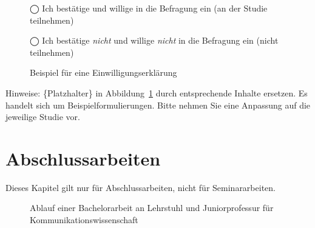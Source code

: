 \documentclass[
  letterpaper,
  DIV=11]{scrreprt}
\begin{document}
\begin{figure}
\hspace{0pt}\hspace{0pt}◯ Ich bestätige und willige in die Befragung ein
(an der Studie teilnehmen)

\hspace{0pt}\hspace{0pt}◯\hspace{0pt} Ich bestätige \emph{nicht} und
willige \emph{nicht} in die Befragung ein (nicht teilnehmen)

\caption{\label{fig-consent}Beispiel für eine Einwilligungserklärung}

\end{figure}%

Hinweise: \{Platzhalter\} in Abbildung~\ref{fig-consent} durch
entsprechende Inhalte ersetzen. Es handelt sich um
Beispielformulierungen. Bitte nehmen Sie eine Anpassung auf die
jeweilige Studie vor.

\chapter{Abschlussarbeiten}\label{abschlussarbeiten}

\begin{tcolorbox}[enhanced jigsaw, left=2mm, rightrule=.15mm, bottomrule=.15mm, bottomtitle=1mm, colback=white, leftrule=.75mm, breakable, titlerule=0mm, toptitle=1mm, opacityback=0, opacitybacktitle=0.6, colbacktitle=quarto-callout-important-color!10!white, colframe=quarto-callout-important-color-frame, arc=.35mm, toprule=.15mm, coltitle=black, title=\textcolor{quarto-callout-important-color}{\faExclamation}\hspace{0.5em}{Wichtig}]

Dieses Kapitel gilt nur für Abschlussarbeiten, nicht für
Seminararbeiten.

\end{tcolorbox}

\begin{figure}


\caption{\label{fig-ablauf}Ablauf einer Bachelorarbeit an Lehrstuhl und
Juniorprofessur für Kommunikationswissenschaft}

\end{figure}%
\end{document}
